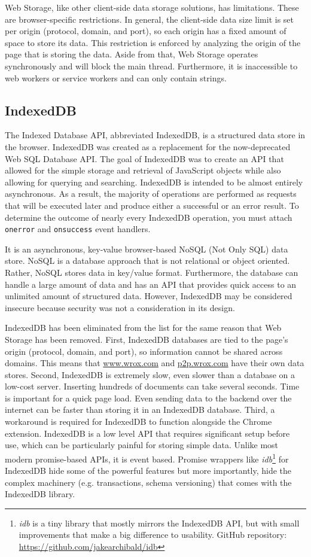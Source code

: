 Web Storage, like other client-side data storage solutions, has limitations. These are browser-specific restrictions. In general, the client-side data size limit is set per origin (protocol, domain, and port), so each origin has a fixed amount of space to store its data. This restriction is enforced by analyzing the origin of the page that is storing the data. Aside from that, Web Storage operates synchronously and will block the main thread. Furthermore, it is inaccessible to web workers or service workers and can only contain strings.

\subsection*{IndexedDB}
The Indexed Database API, abbreviated IndexedDB, is a structured data store in the browser. IndexedDB was created as a replacement for the now-deprecated Web SQL Database API. The goal of IndexedDB was to create an API that allowed for the simple storage and retrieval of JavaScript objects while also allowing for querying and searching. IndexedDB is intended to be almost entirely asynchronous. As a result, the majority of operations are performed as requests that will be executed later and produce either a successful or an error result. To determine the outcome of nearly every IndexedDB operation, you must attach \texttt{onerror} and \texttt{onsuccess} event handlers.

It is an asynchronous, key-value browser-based NoSQL (Not Only SQL) data store. NoSQL is a database approach that is not relational or object oriented. Rather, NoSQL stores data in key/value format. Furthermore, the database can handle a large amount of data and has an API that provides quick access to an unlimited amount of structured data. However, IndexedDB may be considered insecure because security was not a consideration in its design.

IndexedDB has been eliminated from the list for the same reason that Web Storage has been removed. First, IndexedDB databases are tied to the page's origin (protocol, domain, and port), so information cannot be shared across domains. This means that \url{www.wrox.com} and \url{p2p.wrox.com} have their own data stores. Second, IndexedDB is extremely slow, even slower than a database on a low-cost server. Inserting hundreds of documents can take several seconds. Time is important for a quick page load. Even sending data to the backend over the internet can be faster than storing it in an IndexedDB database. Third, a workaround is required for IndexedDB to function alongside the Chrome extension. IndexedDB is a low level API that requires significant setup before use, which can be particularly painful for storing simple data. Unlike most modern promise-based APIs, it is event based. Promise wrappers like \emph{idb}\footnote{\emph{idb} is a tiny library that mostly mirrors the IndexedDB API, but with small improvements that make a big difference to usability. GitHub repository: \url{https://github.com/jakearchibald/idb}} for IndexedDB hide some of the powerful features but more importantly, hide the complex machinery (e.g. transactions, schema versioning) that comes with the IndexedDB library.

